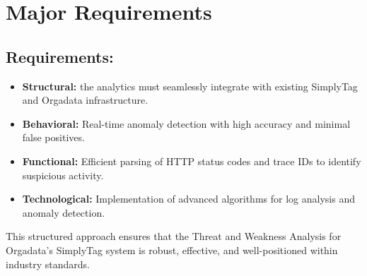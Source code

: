 %
%

\chapter{Major Requirements}

\section{Requirements:}

\begin{itemize}
	\item \textbf{Structural:} the analytics must seamlessly integrate with existing SimplyTag and Orgadata infrastructure.
	\item \textbf{Behavioral:} Real-time anomaly detection with high accuracy and minimal false positives.
	\item \textbf{Functional:} Efficient parsing of HTTP status codes and trace IDs to identify suspicious activity.
	\item \textbf{Technological:} Implementation of advanced algorithms for log analysis and anomaly detection.
\end{itemize}
  
  This structured approach ensures that the Threat and Weakness Analysis for Orgadata’s SimplyTag system is robust, effective, and well-positioned within industry standards.
  
  
   
  
   

 